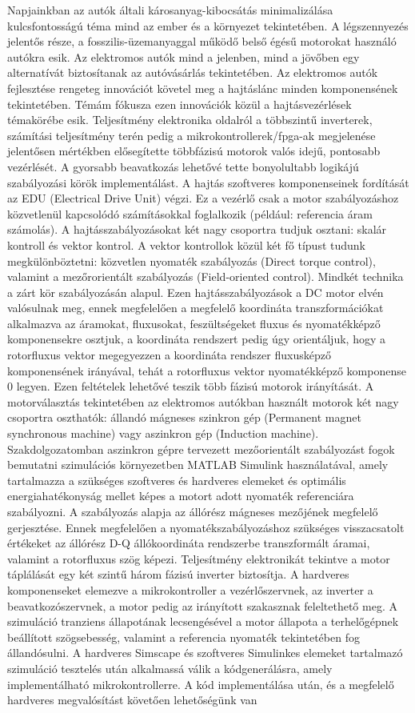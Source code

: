 \documentclass[a4paper,12pt]{article}
\begin{document}
	Napjainkban az autók általi károsanyag-kibocsátás minimalizálása kulcsfontosságú téma mind az ember és a környezet tekintetében. A légszennyezés jelentős része, a fosszilis-üzemanyaggal működő belső égésű motorokat használó autókra esik. Az elektromos autók mind a jelenben, mind a jövőben egy alternatívát biztosítanak az autóvásárlás tekintetében. Az elektromos autók fejlesztése rengeteg innovációt követel meg a hajtáslánc minden komponensének tekintetében. Témám fókusza ezen innovációk közül a hajtásvezérlések témakörébe esik. Teljesítmény elektronika oldalról a többszintű inverterek, számítási teljesítmény terén pedig a mikrokontrollerek/fpga-ak megjelenése jelentősen mértékben elősegítette többfázisú motorok valós idejű, pontosabb vezérlését. A gyorsabb beavatkozás lehetővé tette bonyolultabb logikájú szabályozási körök implementálást. A hajtás szoftveres komponenseinek fordítását az EDU (Electrical Drive Unit) végzi. Ez a vezérlő csak a motor szabályozáshoz közvetlenül kapcsolódó számításokkal foglalkozik (például: referencia áram számolás). A hajtásszabályozásokat két nagy csoportra tudjuk osztani: skalár kontroll és vektor kontrol. A vektor kontrollok közül két fő típust tudunk megkülönböztetni: közvetlen nyomaték szabályozás (Direct torque control), valamint a mezőrorientált szabályozás (Field-oriented control). Mindkét technika a zárt kör szabályozásán alapul. Ezen hajtásszabályozások a DC motor elvén valósulnak meg, ennek megfelelően a megfelelő koordináta transzformációkat alkalmazva az áramokat, fluxusokat, feszültségeket fluxus és nyomatékképző komponensekre osztjuk, a koordináta rendszert pedig úgy orientáljuk, hogy a rotorfluxus vektor megegyezzen a koordináta rendszer fluxusképző komponensének irányával, tehát a rotorfluxus vektor nyomatékképző komponense 0 legyen. Ezen feltételek lehetővé teszik több fázisú motorok irányítását. A motorválasztás tekintetében az elektromos autókban használt motorok két nagy csoportra oszthatók: állandó mágneses szinkron gép (Permanent magnet synchronous machine) vagy aszinkron gép (Induction machine). Szakdolgozatomban aszinkron gépre tervezett mezőorientált szabályozást fogok bemutatni szimulációs környezetben MATLAB Simulink használatával, amely tartalmazza a szükséges szoftveres és hardveres elemeket és optimális energiahatékonyság mellet képes a motort adott nyomaték referenciára szabályozni. A szabályozás alapja az  állórész mágneses mezőjének megfelelő gerjesztése. Ennek megfelelően a nyomatékszabályozáshoz szükséges visszacsatolt értékeket az állórész D-Q állókoordináta rendszerbe transzformált áramai, valamint a rotorfluxus szög képezi. Teljesítmény elektronikát tekintve a motor táplálását egy két szintű három fázisú inverter biztosítja. A hardveres komponenseket elemezve a mikrokontroller a vezérlőszervnek, az inverter a beavatkozószervnek, a motor pedig az irányított szakasznak feleltethető meg. A szimuláció tranziens állapotának lecsengésével a motor állapota a terhelőgépnek beállított szögsebesség, valamint a referencia nyomaték tekintetében fog állandósulni. A hardveres Simscape és szoftveres Simulinkes elemeket tartalmazó szimuláció tesztelés után alkalmassá válik a kódgenerálásra, amely implementálható mikrokontrollerre. A kód implementálása után, és a megfelelő hardveres megvalósítást követően lehetőségünk van 
\end{document}
